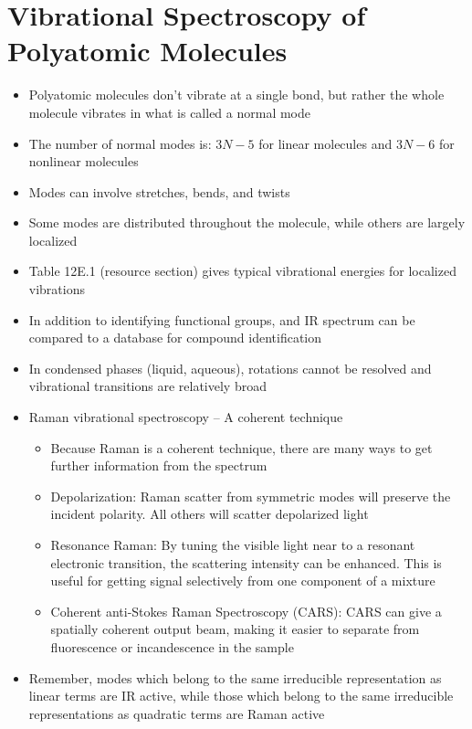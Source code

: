 \documentclass[12pt, openany, letterpaper]{memoir}
\begin{document}
\section{Vibrational Spectroscopy of Polyatomic Molecules}
\begin{itemize}
	\item Polyatomic molecules don't vibrate at a single bond, but rather the whole molecule vibrates in what is called a normal mode
	\item The number of normal modes is: $3N-5$ for linear molecules and $3N-6$ for nonlinear molecules
	\item Modes can involve stretches, bends, and twists
	\item Some modes are distributed throughout the molecule, while others are largely localized
	\item Table 12E.1 (resource section) gives typical vibrational energies for localized vibrations
	\item In addition to identifying functional groups, and IR spectrum can be compared to a database for compound identification
	\item In condensed phases (liquid, aqueous), rotations cannot be resolved and vibrational transitions are relatively broad
	\item Raman vibrational spectroscopy -- A coherent technique
	\begin{itemize}
		\item Because Raman is a coherent technique, there are many ways to get further information from the spectrum
		\item Depolarization: Raman scatter from symmetric modes will preserve the incident polarity. All others will scatter depolarized light
		\item Resonance Raman: By tuning the visible light near to a resonant electronic transition, the scattering intensity can be enhanced. This is useful for getting signal selectively from one component of a mixture
		\item Coherent anti-Stokes Raman Spectroscopy (CARS): CARS can give a spatially coherent output beam, making it easier to separate from fluorescence or incandescence in the sample
	\end{itemize}
	\item Remember, modes which belong to the same irreducible representation as linear terms are IR active, while those which belong to the same irreducible representations as quadratic terms are Raman active
\end{itemize}
\end{document}
